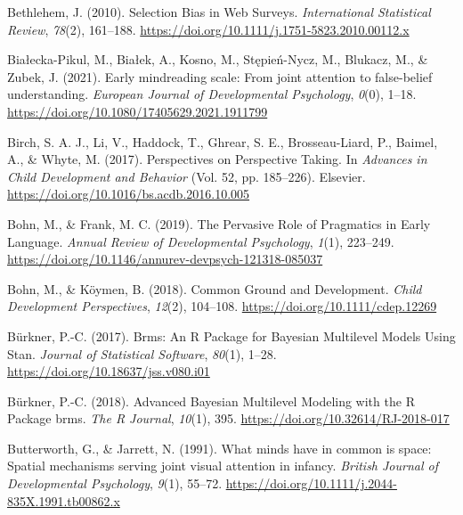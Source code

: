 \documentclass[
  man,mask,floatsintext]{apa7}
\newlength{\cslhangindent}
\newlength{\cslentryspacingunit} %
\newenvironment{CSLReferences}[2] %
 {%
  \setlength{\parindent}{0pt}
  \ifodd #1
  \let\oldpar\par
  \def\par{\hangindent=\cslhangindent\oldpar}
  \fi
  \setlength{\parskip}{#2\cslentryspacingunit}
 }%
 {}
\begin{document}
\begin{CSLReferences}{1}{0}
\leavevmode{}%
Bethlehem, J. (2010). Selection {Bias} in {Web Surveys}. \emph{International Statistical Review}, \emph{78}(2), 161--188. \url{https://doi.org/10.1111/j.1751-5823.2010.00112.x}

\leavevmode{}%
Białecka-Pikul, M., Białek, A., Kosno, M., Stępień-Nycz, M., Blukacz, M., \& Zubek, J. (2021). Early mindreading scale: {From} joint attention to false-belief understanding. \emph{European Journal of Developmental Psychology}, \emph{0}(0), 1--18. \url{https://doi.org/10.1080/17405629.2021.1911799}

\leavevmode{}%
Birch, S. A. J., Li, V., Haddock, T., Ghrear, S. E., Brosseau-Liard, P., Baimel, A., \& Whyte, M. (2017). Perspectives on {Perspective Taking}. In \emph{Advances in {Child Development} and {Behavior}} (Vol. 52, pp. 185--226). Elsevier. \url{https://doi.org/10.1016/bs.acdb.2016.10.005}

\leavevmode{}%
Bohn, M., \& Frank, M. C. (2019). The {Pervasive Role} of {Pragmatics} in {Early Language}. \emph{Annual Review of Developmental Psychology}, \emph{1}(1), 223--249. \url{https://doi.org/10.1146/annurev-devpsych-121318-085037}

\leavevmode{}%
Bohn, M., \& Köymen, B. (2018). Common {Ground} and {Development}. \emph{Child Development Perspectives}, \emph{12}(2), 104--108. \url{https://doi.org/10.1111/cdep.12269}

\leavevmode{}%
Bürkner, P.-C. (2017). Brms: {An R Package} for {Bayesian Multilevel Models Using Stan}. \emph{Journal of Statistical Software}, \emph{80}(1), 1--28. \url{https://doi.org/10.18637/jss.v080.i01}

\leavevmode{}%
Bürkner, P.-C. (2018). Advanced {Bayesian Multilevel Modeling} with the {R Package} brms. \emph{The R Journal}, \emph{10}(1), 395. \url{https://doi.org/10.32614/RJ-2018-017}

\leavevmode{}%
Butterworth, G., \& Jarrett, N. (1991). What minds have in common is space: {Spatial} mechanisms serving joint visual attention in infancy. \emph{British Journal of Developmental Psychology}, \emph{9}(1), 55--72. \url{https://doi.org/10.1111/j.2044-835X.1991.tb00862.x}


\end{CSLReferences}
\end{document}
